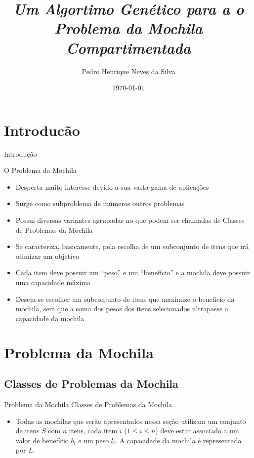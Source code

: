 \documentclass[slidestop,compress,mathserif]{beamer}
\title{\emph{Um Algortimo Genético para a o Problema da Mochila Compartimentada} }
\author{Pedro Henrique Neves da Silva}
\date{\today}
\begin{document}
\begin{frame}
\titlepage
\end{frame}


\section{Introducão}
\begin{frame} {Introdução}

O Problema da Mochila
\begin{itemize}
\item Desperta muito interesse devido a sua vasta gama de aplicações
\item Surge como subproblema de inúmeros outros problemas 
\item  Possui diversas variantes agrupadas no que podem ser chamadas de Classes de Problemas da Mochila
\item Se caracteriza, basicamente, pela escolha de um subconjunto de itens que irá otimizar um objetivo
\item Cada item deve possuir um ``peso'' e um ``benefício'' e a mochila deve possuir uma capacidade máxima
\item Deseja-se escolher um subconjunto de itens que maximize o benefício da mochila, sem que a soma dos pesos dos itens selecionados ultrapasse a capacidade da mochila

\end{itemize}
\end{frame}


\section{Problema da Mochila}

\subsection{Classes de Problemas da Mochila}
\begin{frame} {Problema da Mochila} {Classes de Problemas da Mochila}


\begin{itemize}
 \item Todas as mochilas que serão apresentados nessa seção utilizam um conjunto de itens $S$ com $n$ itens, cada item $i$ ($1 \leq i \leq n$) deve estar associado a um valor de benefício $b_i$ e um peso $l_i$. A capacidade da mochila é representada por $L$.

\end{itemize}

\end{frame}
\end{document}
